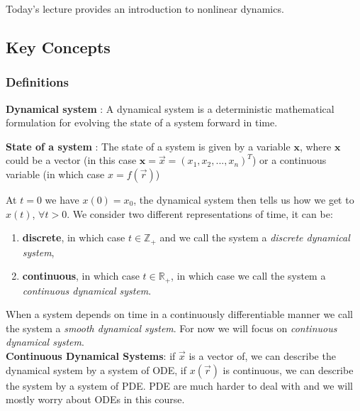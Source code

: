 Today's lecture provides an introduction to nonlinear dynamics. 

\subsection{Key Concepts}
\subsubsection{Definitions}

\begin{definition}
    \textbf{Dynamical system} : A dynamical system is a deterministic mathematical formulation for evolving the state of a system forward in time.
\end{definition}

\begin{definition}
    \textbf{State of a system} : The state of a system is given by a variable $\bm{x}$, where $\bm{x}$ could be a vector (in this case $\bm{x} = \vec{x} = (x_1,x_2,...,x_n)^T$) or a continuous variable (in which case $x = f(\vec{r})$)
\end{definition}

At $t=0$ we have $x(0) = x_0$, the dynamical system then tells us how we get to $x(t)$, $\forall t > 0$. We consider two different representations of time, it can be: 
\begin{enumerate}
    \item \textbf{discrete}, in which case $t \in \mathbb{Z}_+$ and we call the system a \textit{discrete dynamical system},
    \item \textbf{continuous}, in which case $t \in \mathbb{R}_+$, in which case we call the system a \textit{continuous dynamical system}.
\end{enumerate}

When a system depends on time in a continuously differentiable manner we call the system a \textit{smooth dynamical system}. For now we will focus on \textit{continuous dynamical system}.\\

\noindent
\textbf{Continuous Dynamical Systems}: if $\vec{x}$ is a vector of, we can describe the dynamical system by a system of ODE, if $x(\vec{r})$ is continuous, we can describe the system by a system of PDE. PDE are much harder to deal with and we will mostly worry about ODEs in this course.  \\

